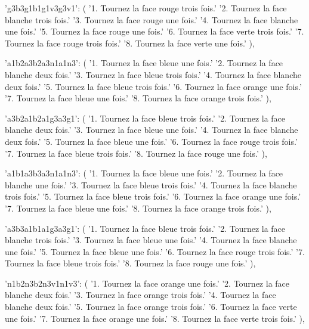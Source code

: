 {{        'g3b3g1b1g1v3g3v1': (
            '1. Tournez la face rouge trois fois.\n'
            '2. Tournez la face blanche trois fois.\n'
            '3. Tournez la face rouge une fois.\n'
            '4. Tournez la face blanche une fois.\n'
            '5. Tournez la face rouge une fois.\n'
            '6. Tournez la face verte trois fois.\n'
            '7. Tournez la face rouge trois fois.\n'
            '8. Tournez la face verte une fois.'
        ),

        'a1b2a3b2a3n1a1n3': (
            '1. Tournez la face bleue une fois.\n'
            '2. Tournez la face blanche deux fois.\n'
            '3. Tournez la face bleue trois fois.\n'
            '4. Tournez la face blanche deux fois.\n'
            '5. Tournez la face bleue trois fois.\n'
            '6. Tournez la face orange une fois.\n'
            '7. Tournez la face bleue une fois.\n'
            '8. Tournez la face orange trois fois.'
        ),

        'a3b2a1b2a1g3a3g1': (
            '1. Tournez la face bleue trois fois.\n'
            '2. Tournez la face blanche deux fois.\n'
            '3. Tournez la face bleue une fois.\n'
            '4. Tournez la face blanche deux fois.\n'
            '5. Tournez la face bleue une fois.\n'
            '6. Tournez la face rouge trois fois.\n'
            '7. Tournez la face bleue trois fois.\n'
            '8. Tournez la face rouge une fois.'
        ),

        'a1b1a3b3a3n1a1n3': (
            '1. Tournez la face bleue une fois.\n'
            '2. Tournez la face blanche une fois.\n'
            '3. Tournez la face bleue trois fois.\n'
            '4. Tournez la face blanche trois fois.\n'
            '5. Tournez la face bleue trois fois.\n'
            '6. Tournez la face orange une fois.\n'
            '7. Tournez la face bleue une fois.\n'
            '8. Tournez la face orange trois fois.'
        ),

        'a3b3a1b1a1g3a3g1': (
            '1. Tournez la face bleue trois fois.\n'
            '2. Tournez la face blanche trois fois.\n'
            '3. Tournez la face bleue une fois.\n'
            '4. Tournez la face blanche une fois.\n'
            '5. Tournez la face bleue une fois.\n'
            '6. Tournez la face rouge trois fois.\n'
            '7. Tournez la face bleue trois fois.\n'
            '8. Tournez la face rouge une fois.'
        ),

        'n1b2n3b2n3v1n1v3': (
            '1. Tournez la face orange une fois.\n'
            '2. Tournez la face blanche deux fois.\n'
            '3. Tournez la face orange trois fois.\n'
            '4. Tournez la face blanche deux fois.\n'
            '5. Tournez la face orange trois fois.\n'
            '6. Tournez la face verte une fois.\n'
            '7. Tournez la face orange une fois.\n'
            '8. Tournez la face verte trois fois.'
        ),

}}
